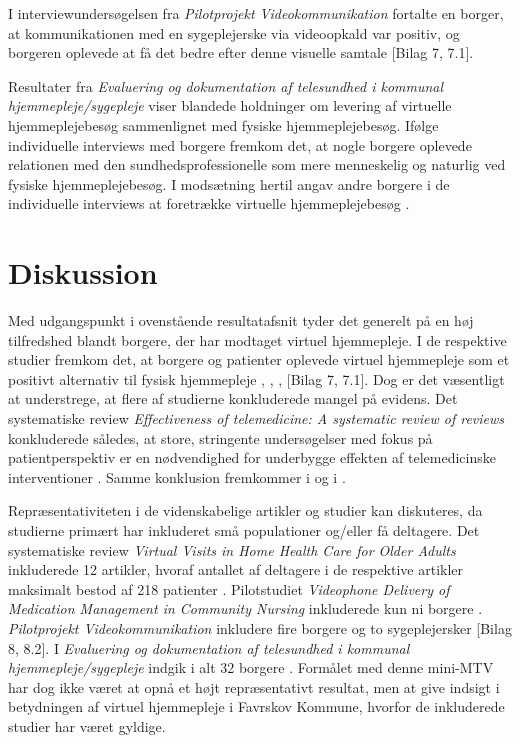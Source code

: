 I interviewundersøgelsen fra \textit{Pilotprojekt Videokommunikation} fortalte en borger, at kommunikationen med en sygeplejerske via videoopkald var positiv, og borgeren oplevede at få det bedre efter denne visuelle samtale [Bilag 7, 7.1]. 

Resultater fra \textit{Evaluering og dokumentation af telesundhed i kommunal hjemmepleje/sygepleje} viser blandede holdninger om levering af virtuelle hjemmeplejebesøg sammenlignet med fysiske hjemmeplejebesøg. Ifølge individuelle interviews med borgere fremkom det, at nogle borgere oplevede relationen med den sundhedsprofessionelle som mere menneskelig og naturlig ved fysiske hjemmeplejebesøg. I modsætning hertil angav andre borgere i de individuelle interviews at foretrække virtuelle hjemmeplejebesøg \cite{kandidat}.

\section{Diskussion}
Med udgangspunkt i ovenstående resultatafsnit tyder det generelt på en høj tilfredshed blandt borgere, der har modtaget virtuel hjemmepleje. I de respektive studier fremkom det, at borgere og patienter oplevede virtuel hjemmepleje som et positivt alternativ til fysisk hjemmepleje  \cite{wade}, \cite{Baf2}, \cite{kandidat}, [Bilag 7, 7.1]. Dog er det væsentligt at understrege, at flere af studierne konkluderede mangel på evidens. Det systematiske review \textit{Effectiveness of telemedicine: A systematic review of reviews} konkluderede således, at store, stringente undersøgelser med fokus på patientperspektiv er en nødvendighed for underbygge effekten af telemedicinske interventioner \cite{Ekeland}. Samme konklusion fremkommer i  \cite{Mair} og i  \cite{ben}. 

Repræsentativiteten i de videnskabelige artikler og studier kan diskuteres, da studierne primært har inkluderet små populationer og/eller få deltagere. Det systematiske review \textit{Virtual Visits in Home Health Care for Older Adults} inkluderede 12 artikler, hvoraf antallet af deltagere i de respektive artikler maksimalt bestod af 218 patienter \cite{Baf2}. Pilotstudiet \textit{Videophone Delivery of Medication Management in Community Nursing} inkluderede kun ni borgere \cite{wade}. \textit{Pilotprojekt Videokommunikation} inkludere fire borgere og to sygeplejersker [Bilag 8, 8.2]. I \textit{Evaluering og dokumentation af telesundhed i kommunal hjemmepleje/sygepleje} indgik i alt 32 borgere \cite{kandidat}. Formålet med denne mini-MTV har dog ikke været at opnå et højt repræsentativt resultat, men at give indsigt i betydningen af virtuel hjemmepleje i Favrskov Kommune, hvorfor de inkluderede studier har været gyldige. 


